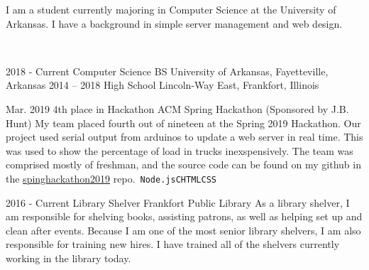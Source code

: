 \documentclass[9pt]{developercv} %
\begin{document}
	\begin{minipage}[t]{0.45\textwidth}
		\vspace{-\baselineskip} %

		I am a student currently majoring in Computer Science at the University of Arkansas. I have a background in simple server management and web design.

	\end{minipage}
	\hfill %
	\begin{minipage}[t]{0.5\textwidth} %
		\vspace{-\baselineskip} %
		\vspace{.2cm}\\
		
	\end{minipage}

\vspace{0.5cm}



\begin{entrylist}
	\entry
		{2018 - Current}
		{Computer Science BS}
		{}
		{University of Arkansas, Fayetteville, Arkansas}
	\entry
		{2014 -- 2018}
		{High School}
		{}
		{Lincoln-Way East, Frankfort, Illinois}
\end{entrylist}


\begin{entrylist}
	\entry
		{Mar. 2019}
		{4th place in Hackathon}
		{ACM Spring Hackathon (Sponsored by J.B. Hunt)}
		{My team placed fourth out of nineteen at the Spring 2019 Hackathon. Our project used serial output from arduinos to update a web server in real time. This was used to show the percentage of load in trucks inexspensively. The team was comprised mostly of freshman, and the source code can be found on my github in the \href{https://www.github.com/dizeeee/springhackathon2019}{spinghackathon2019} repo.\
		\newline\texttt{Node.js}\slashsep\texttt{C}\slashsep\texttt{HTML}\slashsep\texttt{CSS}}
\end{entrylist}

\begin{entrylist}
	\entry
		{2016 - Current}
		{Library Shelver}
		{Frankfort Public Library}
		{As a library shelver, I am responsible for shelving books, assisting patrons, as well as helping set up and clean after events. Because I am one of the most senior library shelvers, I am also responsible for training new hires. I have trained all of the shelvers currently working in the library today.}\
\end{entrylist}
\end{document}
